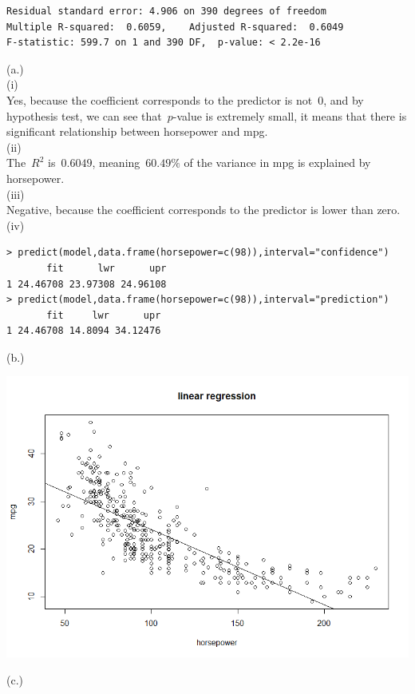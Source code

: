 \documentclass[12pt]{article}
\begin{document}
\begin{itemize}
\begin{verbatim}
Residual standard error: 4.906 on 390 degrees of freedom
Multiple R-squared:  0.6059,	Adjusted R-squared:  0.6049
F-statistic: 599.7 on 1 and 390 DF,  p-value: < 2.2e-16
\end{verbatim}
(a.)\\[3ex]
\hspace{2ex}(i)\\[2ex]
\hspace{2ex}Yes, because the coefficient corresponds to the predictor is not\ $0$, and by hypothesis test, we can see that\ $p$-value is extremely small, it means that there is significant relationship between horsepower and mpg.\\[3ex]
\hspace{2ex}(ii)\\[2ex]
\hspace{2ex}The\ $R^2$ is\ $0.6049$, meaning\ $60.49\%$ of  the variance in mpg is explained by horsepower.\\[3ex]
\hspace{2ex}(iii)\\[2ex]
\hspace{2ex}Negative, because the coefficient corresponds to the predictor is lower than zero.\\[3ex]
\hspace{2ex}(iv)
\begin{verbatim}
> predict(model,data.frame(horsepower=c(98)),interval="confidence")
       fit      lwr      upr
1 24.46708 23.97308 24.96108
> predict(model,data.frame(horsepower=c(98)),interval="prediction")
       fit     lwr      upr
1 24.46708 14.8094 34.12476
\end{verbatim}
\newpage
(b.)\\[3ex]
\centerline{\includegraphics[width=0.8\linewidth]{linear}}
(c.)\\[3ex]

\end{itemize}
\end{document}
